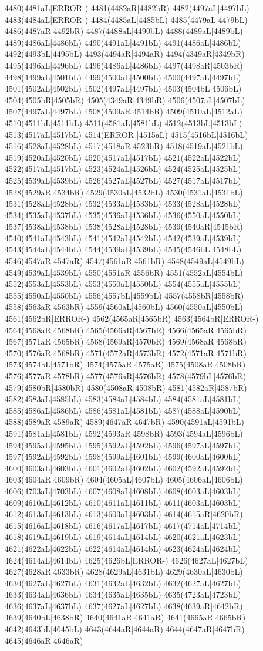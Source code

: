 4480(4481aL|ERROR-) 4481(4482aR|4482bR) 4482(4497aL|4497bL) 4483(4484aL|ERROR-) 4484(4485aL|4485bL) 4485(4479aL|4479bL) 4486(4487aR|4492bR) 4487(4488aL|4490bL) 4488(4489aL|4489bL) 4489(4486aL|4486bL) 4490(4491aL|4491bL) 4491(4486aL|4486bL) 4492(4493bL|4495bL) 4493(4494aR|4494aR) 4494(4349aR|4349bR) 4495(4496aL|4496bL) 4496(4486aL|4486bL) 4497(4498aR|4503bR) 4498(4499aL|4501bL) 4499(4500aL|4500bL) 4500(4497aL|4497bL) 4501(4502aL|4502bL) 4502(4497aL|4497bL) 4503(4504bL|4506bL) 4504(4505bR|4505bR) 4505(4349aR|4349bR) 4506(4507aL|4507bL) 4507(4497aL|4497bL) 4508(4509aR|4514bR) 4509(4510aL|4512aL) 4510(4511bL|4511bL) 4511(4581aL|4581bL) 4512(4513bL|4513bL) 4513(4517aL|4517bL) 4514(ERROR-|4515aL) 4515(4516bL|4516bL) 4516(4528aL|4528bL) 4517(4518aR|4523bR) 4518(4519aL|4521bL) 4519(4520aL|4520bL) 4520(4517aL|4517bL) 4521(4522aL|4522bL) 4522(4517aL|4517bL) 4523(4524aL|4526bL) 4524(4525aL|4525bL) 4525(4539aL|4539bL) 4526(4527aL|4527bL) 4527(4517aL|4517bL) 4528(4529aR|4534bR) 4529(4530aL|4532bL) 4530(4531aL|4531bL) 4531(4528aL|4528bL) 4532(4533aL|4533bL) 4533(4528aL|4528bL) 4534(4535aL|4537bL) 4535(4536aL|4536bL) 4536(4550aL|4550bL) 4537(4538aL|4538bL) 4538(4528aL|4528bL) 4539(4540aR|4545bR) 4540(4541aL|4543bL) 4541(4542aL|4542bL) 4542(4539aL|4539bL) 4543(4544aL|4544bL) 4544(4539aL|4539bL) 4545(4546bL|4548bL) 4546(4547aR|4547aR) 4547(4561aR|4561bR) 4548(4549aL|4549bL) 4549(4539aL|4539bL) 4550(4551aR|4556bR) 4551(4552aL|4554bL) 4552(4553aL|4553bL) 4553(4550aL|4550bL) 4554(4555aL|4555bL) 4555(4550aL|4550bL) 4556(4557bL|4559bL) 4557(4558bR|4558bR) 4558(4563aR|4563bR) 4559(4560aL|4560bL) 4560(4550aL|4550bL) 4561(4562bR|ERROR-) 4562(4565aR|4565bR) 4563(4564bR|ERROR-) 4564(4568aR|4568bR) 4565(4566aR|4567bR) 4566(4565aR|4565bR) 4567(4571aR|4565bR) 4568(4569aR|4570bR) 4569(4568aR|4568bR) 4570(4576aR|4568bR) 4571(4572aR|4573bR) 4572(4571aR|4571bR) 4573(4574bL|4571bR) 4574(4575aR|4575aR) 4575(4508aR|4508bR) 4576(4577aR|4578bR) 4577(4576aR|4576bR) 4578(4579bL|4576bR) 4579(4580bR|4580bR) 4580(4508aR|4508bR) 4581(4582aR|4587bR) 4582(4583aL|4585bL) 4583(4584aL|4584bL) 4584(4581aL|4581bL) 4585(4586aL|4586bL) 4586(4581aL|4581bL) 4587(4588aL|4590bL) 4588(4589aR|4589aR) 4589(4647aR|4647bR) 4590(4591aL|4591bL) 4591(4581aL|4581bL) 4592(4593aR|4598bR) 4593(4594aL|4596bL) 4594(4595aL|4595bL) 4595(4592aL|4592bL) 4596(4597aL|4597bL) 4597(4592aL|4592bL) 4598(4599aL|4601bL) 4599(4600aL|4600bL) 4600(4603aL|4603bL) 4601(4602aL|4602bL) 4602(4592aL|4592bL) 4603(4604aR|4609bR) 4604(4605aL|4607bL) 4605(4606aL|4606bL) 4606(4703aL|4703bL) 4607(4608aL|4608bL) 4608(4603aL|4603bL) 4609(4610aL|4612bL) 4610(4611aL|4611bL) 4611(4603aL|4603bL) 4612(4613aL|4613bL) 4613(4603aL|4603bL) 4614(4615aR|4620bR) 4615(4616aL|4618bL) 4616(4617aL|4617bL) 4617(4714aL|4714bL) 4618(4619aL|4619bL) 4619(4614aL|4614bL) 4620(4621aL|4623bL) 4621(4622aL|4622bL) 4622(4614aL|4614bL) 4623(4624aL|4624bL) 4624(4614aL|4614bL) 4625(4626bL|ERROR-) 4626(4627aL|4627bL) 4627(4628aR|4633bR) 4628(4629aL|4631bL) 4629(4630aL|4630bL) 4630(4627aL|4627bL) 4631(4632aL|4632bL) 4632(4627aL|4627bL) 4633(4634aL|4636bL) 4634(4635aL|4635bL) 4635(4723aL|4723bL) 4636(4637aL|4637bL) 4637(4627aL|4627bL) 4638(4639aR|4642bR) 4639(4640bL|4638bR) 4640(4641aR|4641aR) 4641(4665aR|4665bR) 4642(4643bL|4645bL) 4643(4644aR|4644aR) 4644(4647aR|4647bR) 4645(4646aR|4646aR) 
